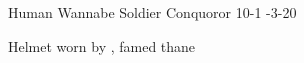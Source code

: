 \begin{filledCS}%
  {\composeHumanName}%
  {Human}%
  {Wannabe Soldier}%
  {Conquoror}%
  {{1}{0}{-1}}%
  {{-3}{-2}{0}}%
  {%
    \setcounter{Athletics}{1}
    \setcounter{Cultivation}{1}
    \setcounter{Deceit}{1}
    \setcounter{Performance}{1}
    \setcounter{Melee}{1}
    \setcounter{Brawl}{1}
    \setcounter{Projectiles}{1}
    \longsword
    \partialleather
    \addtocounter{equipmentWeight}{-2}
  }%
  {}%
  {Helmet worn by \composeHumanName, famed  \gls{thane}}%
  \renewcommand\rank{Fodder}
  \renewcommand\characterDebt{100 \glspl{sp}}

\end{filledCS}

